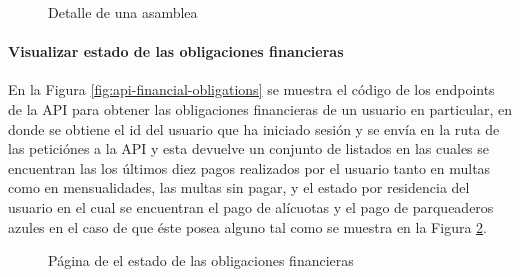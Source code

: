 \begin{figure}[H]
    \centering
    \caption{Detalle de una asamblea}
    \label{fig:app-eventos-detalle}
\end{figure}

\paragraph{Visualizar estado de las obligaciones financieras}

En la Figura \ref{fig:api-financial-obligations} se muestra el código de los endpoints de la API para obtener las obligaciones financieras de un usuario en particular, en donde se obtiene el id del usuario que ha iniciado sesión y se envía en la ruta de las peticiónes a la API y esta devuelve un conjunto de listados en las cuales se encuentran las los últimos diez pagos realizados por el usuario tanto en multas como en mensualidades, las multas sin pagar, y el estado por residencia del usuario en el cual se encuentran el pago de alícuotas y el pago de parqueaderos azules en el caso de que éste posea alguno tal como se muestra en la Figura \ref{fig:app-financial-obligations}.

\begin{figure}[H]
    \centering
    \caption{Página de el estado de las obligaciones financieras}
    \label{fig:app-financial-obligations}
\end{figure}

